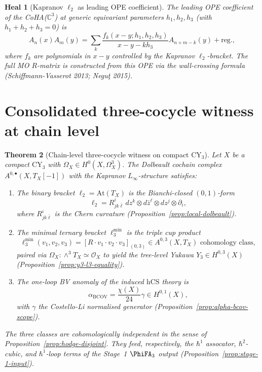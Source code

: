 \documentclass[11pt]{article}
\newtheorem{theorem}{Theorem}[section]
\newtheorem{heal}[theorem]{Heal}
\providecommand{\At}{\mathrm{At}}
\providecommand{\CY}{\mathrm{CY}}
\providecommand{\BCOV}{\mathrm{BCOV}}
\providecommand{\hCS}{\mathrm{hCS}}
\providecommand{\Om}{\Omega}
\providecommand{\cO}{\mathcal{O}}
\begin{document}
\begin{heal}[Kapranov $\ell_2$ as leading OPE coefficient]
\label{heal:10}
The leading OPE coefficient of the CoHA($\mathbb C^3$) at generic
equivariant parameters $h_1, h_2, h_3$ (with $h_1 + h_2 + h_3 = 0$) is
\[
  A_n(x) A_m(y) = \sum_k \frac{f_k(x - y; h_1, h_2, h_3)}{x - y - k h_3}
    A_{n + m - k}(y) + \text{reg.},
\]
where $f_k$ are polynomials in $x - y$ controlled by the Kapranov
$\ell_2$-bracket. The full MO $R$-matrix is constructed from this OPE
via the wall-crossing formula (Schiffmann-Vasserot 2013; Negu\c{t} 2015).
\end{heal}

\section{Consolidated three-cocycle witness at chain level}
\label{sec:chain-level-witness}

\begin{theorem}[Chain-level three-cocycle witness on compact $\CY_3$]
\label{thm:chain-level-witness}
Let $X$ be a compact $\CY_3$ with $\Om_X \in H^0(X, \Om^3_X)$. The
Dolbeault cochain complex $A^{0,\bullet}(X, T_X[-1])$ with the Kapranov
$L_\infty$-structure satisfies:
\begin{enumerate}
\item The binary bracket $\ell_2 = \At(T_X)$ is the Bianchi-closed
$(0,1)$-form
\[
  \ell_2 = R^i_{jk\bar\ell} \, dz^k \otimes d\bar z^\ell \otimes dz^j
    \otimes \partial_i,
\]
where $R^i_{jk\bar\ell}$ is the Chern curvature (Proposition~\ref{prop:local-dolbeault}).
\item The minimal ternary bracket $\ell_3^{\min}$ is the triple cup
product
\[
  \ell_3^{\min}(v_1, v_2, v_3) = [R \cdot v_1 \cdot v_2 \cdot v_3]_{(0,3)}
    \in A^{0,3}(X, T_X) \text{ cohomology class},
\]
paired via $\Om_X: \wedge^3 T_X \simeq \cO_X$ to yield the tree-level
Yukawa $Y_3 \in H^{0,3}(X)$ (Proposition~\ref{prop:y3-l3-equality}).
\item The one-loop BV anomaly of the induced $\hCS$ theory is
\[
  \alpha_\BCOV = \frac{\chi(X)}{24} \gamma \in H^{0,1}(X),
\]
with $\gamma$ the Costello-Li normalised generator (Proposition~\ref{prop:alpha-bcov-scope}).
\end{enumerate}
The three classes are cohomologically independent in the sense of
Proposition~\ref{prop:hodge-disjoint}. They feed, respectively, the
$\hbar^1$ assocator, $\hbar^2$-cubic, and $\hbar^1$-loop terms of the
Stage~1 $\PhiFA_3$ output (Proposition~\ref{prop:stage-1-input}).
\end{theorem}
\end{document}
